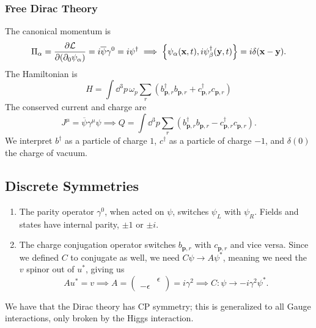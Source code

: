 \documentclass{article}
\begin{document}
\subsubsection{Free Dirac Theory}

The canonical momentum is 
\begin{equation}
    \Pi_\alpha=\pde{\mathcal L}{(\partial_0\psi_\alpha)}=i\overline\psi\gamma^0=i\psi^\dag\implies\acomm{\psi_\alpha(\mathbf x,t)}{i\psi^\dag_\beta(\mathbf y,t)}=i\delta(\mathbf x-\mathbf y).
\end{equation}
The Hamiltonian is 
\begin{equation}
    H=\int\dd^3p\,\omega_p\sum_r\left(b^\dag_{\mathbf p,r}b_{\mathbf p,r}+c^\dag_{\mathbf p,r}c_{\mathbf p,r}\right)
\end{equation}
The conserved current and charge are 
\begin{equation}
    J^\mu=\overline\psi\gamma^\mu\psi\implies Q=\int\dd^3p\sum_r\left(b^\dag_{\mathbf p,r}b_{\mathbf p,r}-c^\dag_{\mathbf p,r}c_{\mathbf p,r}\right).
\end{equation}
We interpret $b^\dag$ as a particle of charge $1$, $c^\dag$ as a particle of charge $-1$, and $\delta(0)$ the charge of vacuum. 

\subsection{Discrete Symmetries}

\begin{enumerate}[label=(\alph*)]
    \item The parity operator $\gamma^0$, when acted on $\psi$, switches $\psi_L$ with $\psi_R$. Fields and states have internal parity, $\pm 1$ or $\pm i$. 
    \item The charge conjugation operator switches $b_{\mathbf p,r}$ with $c_{\mathbf p,r}$ and vice versa. Since we defined $C$ to conjugate as well, we need $C\psi\to A\psi^*$, meaning we need the $v$ spinor out of $u^*$, giving us
    \begin{equation}
        Au^*=v\implies A=\begin{pmatrix}&\epsilon\\-\epsilon\end{pmatrix}=i\gamma^2\implies C:\psi\to-i\gamma^2\psi^*.
    \end{equation}
\end{enumerate}

We have that the Dirac theory has CP symmetry; this is generalized to all Gauge interactions, only broken by the Higgs interaction.
\end{document}
